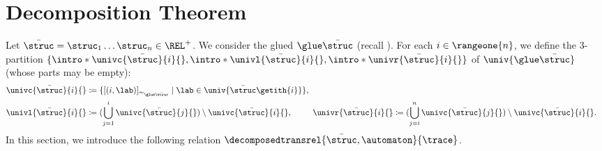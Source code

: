 \documentclass[10pt,a4paper]{article}
\theoremstyle{definition}
\theoremstyle{remark}
\DeclarePairedDelimiter\set{\{}{\}}
\DeclarePairedDelimiter\tuple{(}{)}
\newcommand{\defeq}{\coloneq}
\newcommand{\mul}[1]{\bar{#1}}
\begin{document}
\section{Decomposition Theorem}\label{section: decomposing derivatives}
Let $\mul{\struc} = \struc_1 \dots \struc_n \in \REL^{+}$.
We consider the glued  $\glue \mul{\struc}$ (recall ).
For each $i \in \rangeone{n}$, we define the $3$-partition $\set{\intro*\univc{\mul{\struc}}{i}{}, \intro*\univl{\mul{\struc}}{i}{}, \intro*\univr{\mul{\struc}}{i}{}}$ of $\univ{\glue \mul{\struc}}$ (whose parts may be empty):
\begin{align*}
\univc{\mul{\struc}}{i}{} &\defeq \set{[\tuple{i, \lab}]_{\sim_{\glue \mul{\struc}}} \mid \lab \in \univ{\mul{\struc}\getith{i}}},\\ 
\univl{\mul{\struc}}{i}{} &\defeq (\bigcup_{j = 1}^{i} \univc{\mul{\struc}}{j}{}) \setminus \univc{\mul{\struc}}{i}{},& \hspace{-.5em} 
\univr{\mul{\struc}}{i}{} &\defeq (\bigcup_{j = i}^{n} \univc{\mul{\struc}}{j}{}) \setminus \univc{\mul{\struc}}{i}{}.
\end{align*}
In this section, we introduce the following relation $\decomposedtransrel{\mul{\struc}, \automaton}{\trace}$.
\end{document}
